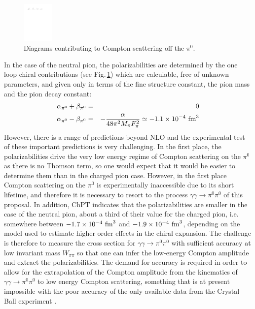 \begin{figure}[h]
\begin{center}
\includegraphics[height=2cm,angle=0]{figures/Fig-TP-1.pdf}
\end{center}
\caption{Diagrams contributing to Compton scattering off the $\pi^0$.
\label{fig:digrams}}
\end{figure}


In the case of the neutral pion, the polarizabilities are determined
by the one loop chiral contributions (see Fig.\,\ref{fig:digrams})
which are calculable, free of unknown parameters, and given only in
terms of the fine structure constant, the pion mass and the pion decay
constant:
\begin{eqnarray}
\alpha_{\pi^0}+\beta_{\pi^0}&=&0\nonumber\\
\alpha_{\pi^0}-\beta_{\pi^0}&=&-\frac{\alpha}{48 \pi^2 M_\pi F_\pi^2}\simeq -1.1\times 10^{-4}~{\rm fm}^3
\end{eqnarray}
However, there is a range of predictions beyond
NLO and the experimental test of these important predictions is very
challenging. In the first place, the polarizabilities drive the very
low energy regime of Compton scattering on the $\pi^0$ as there is no
Thomson term, so one would expect that it would be easier to determine
them than in the charged pion case.  However, in the first place
Compton scattering on the $\pi^0$ is experimentally inaccessible due
to its short lifetime, and therefore it is necessary to resort to the
process $\gamma\gamma\to \pi^0\pi^0$ of this proposal. In addition, ChPT
indicates that the
polarizabilities are smaller in the case of the neutral pion, about a
third of their value for the charged pion, i.e. somewhere between
$-1.7\times 10^{-4}~{\rm fm}^3$ and $-1.9\times 10^{-4}~{\rm fm}^3$,
depending on the model used to estimate higher order effects in the chiral
expansion. The challenge is therefore to measure the
cross section for $\gamma\gamma \to \pi^0\pi^0$ with sufficient
accuracy at low invariant mass $W_{\pi\pi}$ so that one can infer the
low-energy Compton amplitude and extract the polarizabilities. The demand for
accuracy is required in order to allow for the extrapolation of the Compton
amplitude from the kinematics of $\gamma\gamma \to \pi^0\pi^0$ to   low energy
Compton scattering, something that is at present impossible with the poor
accuracy of the only available data from the Crystal Ball experiment \cite{}.
 



